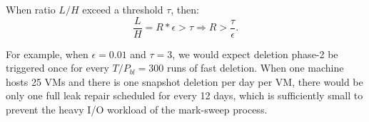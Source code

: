 When ratio $L/H$ exceed a threshold $\tau$, then:
\[
\frac{L}{H} = R * \epsilon > \tau \Rightarrow R > \frac{\tau}{\epsilon}.
\]

For example, when $\epsilon = 0.01$ and $\tau=3$, 
we would expect deletion phase-2 be triggered once for 
every $T/P_{bl} = 300$ runs of fast deletion. 
When one machine hosts 25 VMs and there is one snapshot deletion per day per VM, there would be 
only one full leak repair scheduled for every 12 days, which is sufficiently small to prevent the 
heavy I/O workload of the mark-sweep process.

